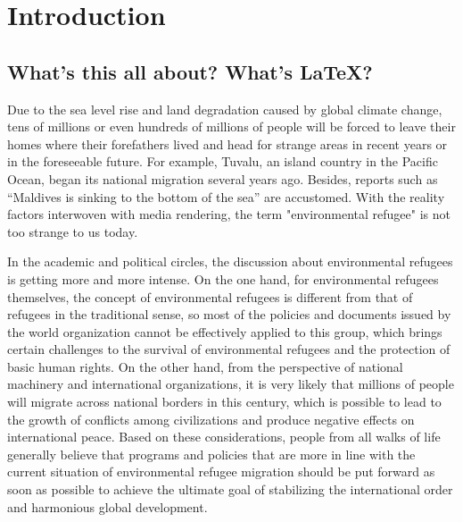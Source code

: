 \documentclass{mcmthesis}
\date{\today}
\begin{document}
\begin{abstract}
\lipsum[1]zhelishihhhhh%
\begin{keywords}
keyword1; keyword2
\end{keywords}
\end{abstract}
\maketitle
\section{Introduction}
\subsection{What's this all about? What's \LaTeX?}
Due to the sea level rise and land degradation caused by global climate change, tens of millions or even hundreds of millions of people will be forced to leave their homes where their forefathers lived and head for strange areas in recent years or in the foreseeable future. For example, Tuvalu, an island country in the Pacific Ocean, began its national migration several years ago. Besides, reports such as “Maldives is sinking to the bottom of the sea” are accustomed. With the reality factors interwoven with media rendering, the term "environmental refugee" is not too strange to us today.


In the academic and political circles, the discussion about environmental refugees is getting more and more intense. On the one hand, for environmental refugees themselves, the concept of environmental refugees is different from that of refugees in the traditional sense, so most of the policies and documents issued by the world organization cannot be effectively applied to this group, which brings certain challenges to the survival of environmental refugees and the protection of basic human rights. On the other hand, from the perspective of national machinery and international organizations, it is very likely that millions of people will migrate across national borders in this century, which is possible to lead to the growth of conflicts among civilizations and produce negative effects on international peace. Based on these considerations, people from all walks of life generally believe that programs and policies that are more in line with the current situation of environmental refugee migration should be put forward as soon as possible to achieve the ultimate goal of stabilizing the international order and harmonious global development.
\end{document}
